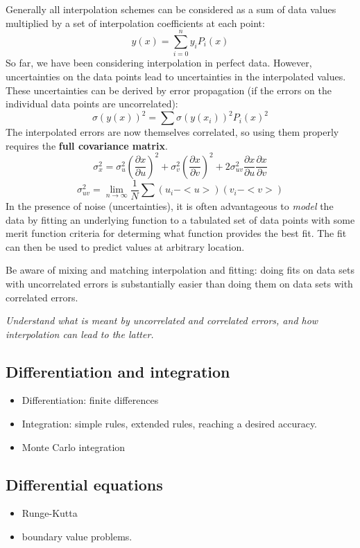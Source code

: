 \documentclass{article}
\newcommand{\test}[1]{%
    \begin{center}
        \colorbox{hl}{\parbox{0.9\textwidth}{\emph{\centering #1}}}
    \end{center}}
\begin{document}
Generally all interpolation schemes can be considered as a sum of data
values multiplied by a set of interpolation coefficients at each
point:
\[
    y(x) = \sum_{i=0}^{n}{
        y_{i}P_{i}(x)}
    \]
So far, we have been considering interpolation in perfect data.
However, uncertainties on the data points lead to
uncertainties in the interpolated values.
These uncertainties can be derived by error propagation (if the errors on
the individual data points are uncorrelated):
\[
    \sigma(y(x))^{2} = \sum{
        \sigma(y(x_{i}))^{2} P_{i}(x)^{2}}
        \]
The interpolated errors are now themselves correlated, so using them
properly requires the \textbf{full covariance matrix}.
\[
    \sigma_{x}^{2} = {
        \sigma_{u}^{2} \left( \frac{\partial{x}}{\partial{u}} \right) ^{2} +
        \sigma_{v}^{2} \left( \frac{\partial{x}}{\partial{v}} \right) ^{2} +
        2\sigma_{uv}^{2}
        \frac{\partial{x}}{\partial{u}}\frac{\partial{x}}{\partial{v}}}
    \]
\[
    \sigma_{uv}^{2} = \lim_{n\rightarrow\infty}\frac{1}{N}
    \sum{
        (u_{i} - <u>)(v_{i} - <v>)}
    \]
In the presence of noise (uncertainties), it is often advantageous to
\emph{model} the data by fitting an underlying function to a tabulated set of
data points with some merit function criteria for determing what function
provides the best fit. The fit can then be used to predict values at arbitrary
location.

Be aware of mixing and matching interpolation and fitting: doing fits on data
sets with uncorrelated errors is substantially easier than doing them on data
sets with correlated errors.

\test{Understand what is meant by uncorrelated and correlated errors, and
how interpolation can lead to the latter.}

\subsection{Differentiation and integration}
\begin{itemize}
    \item Differentiation: finite differences
    \item Integration: simple
        rules, extended rules, reaching a desired accuracy.
    \item Monte Carlo integration
\end{itemize}

\subsection{Differential equations}
\begin{itemize}
    \item Runge-Kutta
    \item boundary value problems.
\end{itemize}
\end{document}
